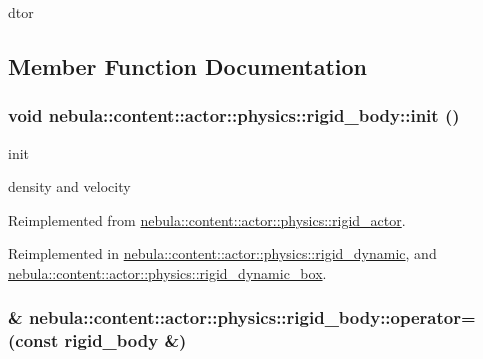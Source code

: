 dtor 

\subsection{Member Function Documentation}
\hypertarget{classnebula_1_1content_1_1actor_1_1physics_1_1rigid__body_a858ee11f899acf3cc8f94eccf5713384}{
\subsubsection[{init}]{\setlength{\rightskip}{0pt plus 5cm}void nebula::content::actor::physics::rigid\_\-body::init ()}}
\label{classnebula_1_1content_1_1actor_1_1physics_1_1rigid__body_a858ee11f899acf3cc8f94eccf5713384}


init 

density and velocity 

Reimplemented from \hyperlink{classnebula_1_1content_1_1actor_1_1physics_1_1rigid__actor_a9c4d9fe73271ad35a646c95fc12b4cde}{nebula::content::actor::physics::rigid\_\-actor}.

Reimplemented in \hyperlink{classnebula_1_1content_1_1actor_1_1physics_1_1rigid__dynamic_ae9450372c5f60103573ed626ffda9532}{nebula::content::actor::physics::rigid\_\-dynamic}, and \hyperlink{classnebula_1_1content_1_1actor_1_1physics_1_1rigid__dynamic__box_a235e20a7e695a39c7ccb0100b90c10ee}{nebula::content::actor::physics::rigid\_\-dynamic\_\-box}.\hypertarget{classnebula_1_1content_1_1actor_1_1physics_1_1rigid__body_afeaa8197cacc9b3f9e2b618f0ee0443b}{
\subsubsection[{operator=}]{\& nebula::content::actor::physics::rigid\_\-body::operator= (const {\bf rigid\_\-body} \&)}}
\label{classnebula_1_1content_1_1actor_1_1physics_1_1rigid__body_afeaa8197cacc9b3f9e2b618f0ee0443b}


